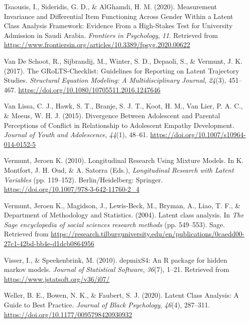 \documentclass[
  ,man,floatsintext]{apa6}
\newlength{\cslhangindent}
\newlength{\cslentryspacingunit} %
\newenvironment{CSLReferences}[2] %
 {%
  \setlength{\parindent}{0pt}
  \ifodd #1
  \let\oldpar\par
  \def\par{\hangindent=\cslhangindent\oldpar}
  \fi
  \setlength{\parskip}{#2\cslentryspacingunit}
 }%
 {}
\begin{document}
\begin{CSLReferences}{1}{0}
\leavevmode{}%
Tsaousis, I., Sideridis, G. D., \& AlGhamdi, H. M. (2020). Measurement {Invariance} and {Differential} {Item} {Functioning} {Across} {Gender} {Within} a {Latent} {Class} {Analysis} {Framework}: {Evidence} {From} a {High}-{Stakes} {Test} for {University} {Admission} in {Saudi} {Arabia}. \emph{Frontiers in Psychology}, \emph{11}. Retrieved from \url{https://www.frontiersin.org/articles/10.3389/fpsyg.2020.00622}

\leavevmode{}%
Van De Schoot, R., Sijbrandij, M., Winter, S. D., Depaoli, S., \& Vermunt, J. K. (2017). The {GRoLTS}-{Checklist}: {Guidelines} for {Reporting} on {Latent} {Trajectory} {Studies}. \emph{Structural Equation Modeling: A Multidisciplinary Journal}, \emph{24}(3), 451--467. \url{https://doi.org/10.1080/10705511.2016.1247646}

\leavevmode{}%
Van Lissa, C. J., Hawk, S. T., Branje, S. J. T., Koot, H. M., Van Lier, P. A. C., \& Meeus, W. H. J. (2015). Divergence {Between} {Adolescent} and {Parental} {Perceptions} of {Conflict} in {Relationship} to {Adolescent} {Empathy} {Development}. \emph{Journal of Youth and Adolescence}, \emph{44}(1), 48--61. \url{https://doi.org/10.1007/s10964-014-0152-5}

\leavevmode{}%
Vermunt, Jeroen K. (2010). Longitudinal {Research} {Using} {Mixture} {Models}. In K. Montfort, J. H. Oud, \& A. Satorra (Eds.), \emph{Longitudinal {Research} with {Latent} {Variables}} (pp. 119--152). Berlin/Heidelberg: Springer. \url{https://doi.org/10.1007/978-3-642-11760-2_4}

\leavevmode{}%
Vermunt, Jeroen K., Magidson, J., Lewis-Beck, M., Bryman, A., Liao, T. F., \& Department of Methodology and Statistics. (2004). Latent class analysis. In \emph{The {Sage} encyclopedia of social sciences research methods} (pp. 549--553). Sage. Retrieved from \url{https://research.tilburguniversity.edu/en/publications/0caedd00-27c1-42bd-bb4e-d1dcb0864956}

\leavevmode{}%
Visser, I., \& Speekenbrink, M. (2010). {depmixS4}: An {R} package for hidden markov models. \emph{Journal of Statistical Software}, \emph{36}(7), 1--21. Retrieved from \url{https://www.jstatsoft.org/v36/i07/}

\leavevmode{}%
Weller, B. E., Bowen, N. K., \& Faubert, S. J. (2020). Latent {Class} {Analysis}: {A} {Guide} to {Best} {Practice}. \emph{Journal of Black Psychology}, \emph{46}(4), 287--311. \url{https://doi.org/10.1177/0095798420930932}

\end{CSLReferences}
\end{document}

